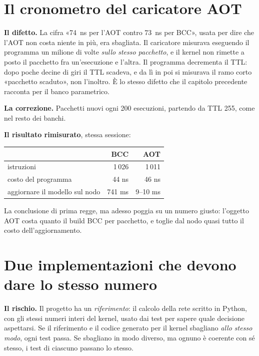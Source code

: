 \documentclass[11pt,a4paper,oneside]{report}
\begin{document}
\section{Il cronometro del caricatore AOT}

\textbf{Il difetto.} La cifra «74~ns per l'AOT contro 73~ns per BCC», usata per dire
che l'AOT non costa niente in più, era sbagliata. Il caricatore misurava
eseguendo il programma un milione di volte \emph{sullo stesso pacchetto}, e il
kernel non rimette a posto il pacchetto fra un'esecuzione e l'altra. Il programma
decrementa il TTL: dopo poche decine di giri il TTL scadeva, e da lì in poi si
misurava il ramo corto «pacchetto scaduto», non l'inoltro. È lo stesso difetto
che il capitolo precedente racconta per il banco parametrico.

\textbf{La correzione.} Pacchetti nuovi ogni 200 esecuzioni, partendo da TTL 255,
come nel resto dei banchi.

\textbf{Il risultato rimisurato}, stessa sessione:

\begin{center}
\small
\begin{tabular}{@{}lrr@{}}
\toprule
& \textbf{BCC} & \textbf{AOT} \\
\midrule
istruzioni & 1\,026 & 1\,011 \\
costo del programma & 44 ns & 46 ns \\
aggiornare il modello sul nodo & 741 ms & 9--10 ms \\
\bottomrule
\end{tabular}
\end{center}

La conclusione di prima regge, ma adesso poggia su un numero giusto: l'oggetto AOT
costa quanto il build BCC per pacchetto, e toglie dal nodo quasi tutto il costo
dell'aggiornamento.

\section{Due implementazioni che devono dare lo stesso numero}

\textbf{Il rischio.} Il progetto ha un \emph{riferimento}: il calcolo della rete
scritto in Python, con gli stessi numeri interi del kernel, usato dai test per
sapere quale decisione aspettarsi. Se il riferimento e il codice generato per il
kernel sbagliano \emph{allo stesso modo}, ogni test passa. Se sbagliano in modo
diverso, ma ognuno è coerente con sé stesso, i test di ciascuno passano lo stesso.
\end{document}
